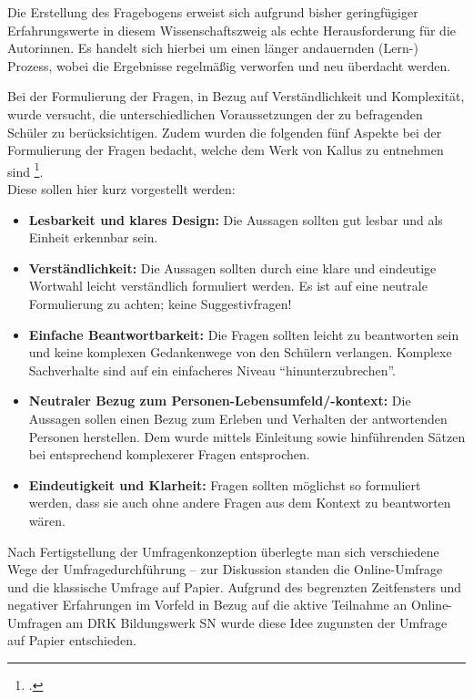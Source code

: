 Die Erstellung des Fragebogens erweist sich aufgrund bisher geringfügiger Erfahrungswerte in diesem Wissenschaftszweig als echte Herausforderung für die Autorinnen. Es handelt sich hierbei um einen länger andauernden (Lern-) Prozess, wobei die Ergebnisse regelmäßig verworfen und neu überdacht werden.
 
Bei der Formulierung der Fragen, in Bezug auf Verständlichkeit und Komplexität, wurde versucht, die unterschiedlichen Voraussetzungen der zu befragenden Schüler zu berücksichtigen. Zudem wurden die folgenden fünf Aspekte bei der Formulierung der Fragen bedacht, welche dem Werk von Kallus zu entnehmen sind \footcite[vgl.][63-66]{Kallus2010}.\\

\noindent
Diese sollen hier kurz vorgestellt werden:

\begin{itemize}
	\item \textbf{Lesbarkeit und klares Design:} Die Aussagen sollten gut lesbar und als Einheit erkennbar sein. 
	\item \textbf{Verständlichkeit:} Die Aussagen sollten durch eine klare und eindeutige Wortwahl leicht verständlich formuliert werden. Es ist auf eine neutrale Formulierung zu achten; keine Suggestivfragen!
	\item \textbf{Einfache Beantwortbarkeit:} Die Fragen sollten leicht zu beantworten sein und keine komplexen Gedankenwege von den Schülern verlangen. Komplexe Sachverhalte sind auf ein einfacheres Niveau "`hinunterzubrechen"'.
	\item \textbf{Neutraler Bezug zum Personen-Lebensumfeld/-kontext:} Die Aussagen sollen einen Bezug zum Erleben und Verhalten der antwortenden Personen herstellen. Dem wurde mittels Einleitung sowie hinführenden Sätzen bei entsprechend komplexerer Fragen entsprochen.
	\item \textbf{Eindeutigkeit und Klarheit:} Fragen sollten möglichst so formuliert werden, dass sie auch ohne andere Fragen aus dem Kontext zu beantworten wären.
\end{itemize}

\noindent
Nach Fertigstellung der Umfragenkonzeption überlegte man sich verschiedene Wege der Umfragedurchführung -- zur Diskussion standen die Online-Umfrage und die klassische Umfrage auf Papier. Aufgrund des begrenzten Zeitfensters und negativer Erfahrungen im Vorfeld in Bezug auf die aktive Teilnahme an Online-Umfragen am DRK Bildungswerk SN wurde diese Idee zugunsten der Umfrage auf Papier entschieden.\\

